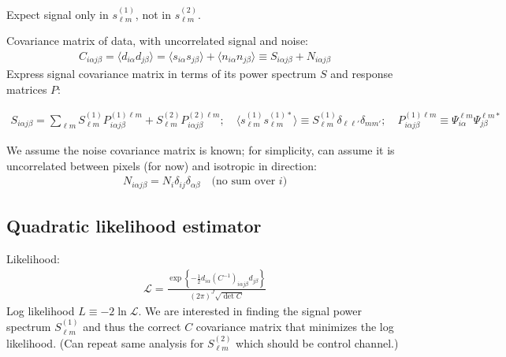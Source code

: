 \documentclass[twocolumn]{aastex63}
\newcommand{\Cinv}{(C^{-1})}
\begin{document}
Expect signal only in $s_{\ell m}^{(1)}$, not in $s_{\ell m}^{(2)}$.

Covariance matrix of data, with uncorrelated signal and noise:
\begin{align}
C_{i\alpha j \beta} = \langle d_{i \alpha} d_{j \beta} \rangle = \langle s_{i \alpha} s_{j \beta} \rangle + \langle n_{i \alpha} n_{j \beta} \rangle \equiv S_{i \alpha j \beta} + N_{i \alpha j \beta}
\end{align}
Express signal covariance matrix in terms of its power spectrum $S$ and response matrices $P$:
\begin{widetext}
\begin{align}
S_{i \alpha j \beta} = \sum_{\ell m} S^{(1)}_{\ell m} P_{i \alpha j \beta}^{(1) \ell m } + S^{(2)}_{\ell m} P_{i \alpha j \beta}^{(2) \ell m }; \quad \langle s^{(1)}_{\ell m} s^{(1)*}_{\ell m} \rangle \equiv S^{(1)}_{\ell m} \delta_{\ell \ell'} \delta_{m m'}; \quad P_{i \alpha j \beta}^{(1) \ell m } \equiv \Psi_{i \alpha}^{\ell m} \Psi_{j \beta}^{\ell m *}
\end{align}
\end{widetext}

We assume the noise covariance matrix is known; for simplicity, can assume it is uncorrelated between pixels (for now) and isotropic in direction:
\begin{align}
N_{i \alpha j \beta} = N_i \delta_{ij} \delta_{\alpha \beta} \quad \text{(no sum over $i$)} \label{eq:Ndiagonal}
\end{align}

\subsection{Quadratic likelihood estimator}
Likelihood:
\begin{align}
\mathcal{L} = \frac{\exp\left\lbrace -\frac{1}{2} d_{i \alpha} \Cinv_{i \alpha j \beta} d_{j \beta} \right\rbrace}{(2\pi)^J \sqrt{\det C}}
\end{align}
Log likelihood $L \equiv - 2 \ln \mathcal{L}$. We are interested in finding the signal power spectrum $S^{(1)}_{\ell m}$ and thus the correct $C$ covariance matrix that minimizes the log likelihood. (Can repeat same analysis for $S^{(2)}_{\ell m}$ which should be control channel.)
\end{document}

